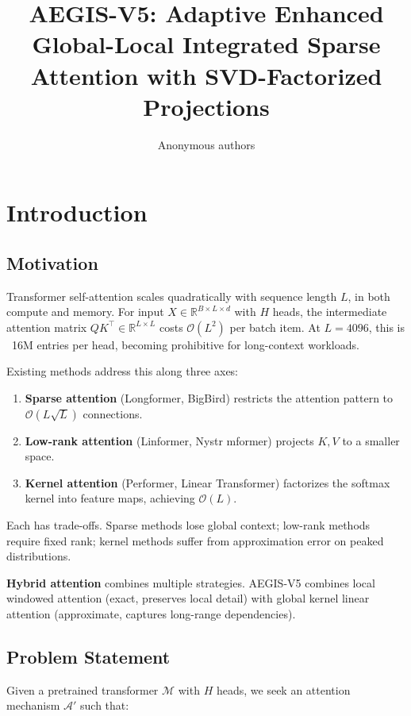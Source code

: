 \title{\textbf{AEGIS-V5: Adaptive Enhanced Global-Local Integrated Sparse Attention with SVD-Factorized Projections}}

\author{Anonymous authors}


\section{Introduction}

\subsection{Motivation}

Transformer self-attention scales quadratically with sequence length $L$, 
in both compute and memory. For input $X \in \mathbb{R}^{B \times L \times d}$ 
with $H$ heads, the intermediate attention matrix $Q K^\top \in \mathbb{R}^{L \times L}$ 
costs $\mathcal{O}(L^2)$ per batch item. At $L = 4096$, this is ~16M 
entries per head, becoming prohibitive for long-context workloads.

Existing methods address this along three axes:

\begin{enumerate}
\item \textbf{Sparse attention} (Longformer, BigBird) restricts the attention
  pattern to $\mathcal{O}(L \sqrt{L})$ connections.
\item \textbf{Low-rank attention} (Linformer, Nystr mformer) projects $K, V$ to a
  smaller space.
\item \textbf{Kernel attention} (Performer, Linear Transformer) factorizes the
  softmax kernel into feature maps, achieving $\mathcal{O}(L)$.

\end{enumerate}
Each has trade-offs. Sparse methods lose global context; low-rank methods 
require fixed rank; kernel methods suffer from approximation error on 
peaked distributions.

\textbf{Hybrid attention} combines multiple strategies. AEGIS-V5 combines local 
windowed attention (exact, preserves local detail) with global kernel 
linear attention (approximate, captures long-range dependencies).

\subsection{Problem Statement}

Given a pretrained transformer $\mathcal{M}$ with $H$ heads, we seek an 
attention mechanism $\mathcal{A}'$ such that:

